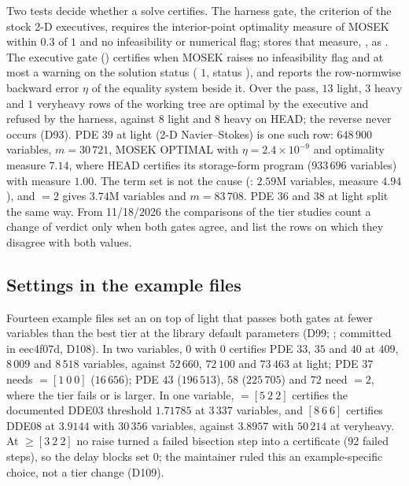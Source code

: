 Two tests decide whether a solve certifies. The harness gate, the criterion of the stock 2-D executives, requires the interior-point optimality measure of MOSEK within $0.3$ of $1$ and no infeasibility or numerical flag;  stores that measure, , as . The executive gate () certifies when MOSEK raises no infeasibility flag and at most a warning on the solution status ( $1$, status ), and reports the row-normwise backward error $\eta$ of the equality system beside it. Over the pass, $13$ light, $3$ heavy and $1$ veryheavy rows of the working tree are optimal by the executive and refused by the harness, against $8$ light and $8$ heavy on HEAD; the reverse never occurs (D93). PDE $39$ at light (2-D Navier--Stokes) is one such row: $648\,900$ variables, $m=30\,721$, MOSEK OPTIMAL with $\eta=2.4\times10^{-9}$ and optimality measure $7.14$, where HEAD certifies its storage-form program ($933\,696$ variables) with measure $1.00$. The term set is not the cause (: $2.59$M variables, measure $4.94$), and  $=2$ gives $3.74$M variables and $m=83\,708$. PDE $36$ and $38$ at light split the same way. From 11/18/2026 the comparisons of the tier studies count a change of verdict only when both gates agree, and list the rows on which they disagree with both values.

\subsection{Settings in the example files}\label{sec:libpass-examples}

Fourteen example files set an  on top of light that passes both gates at fewer variables than the best tier at the library default parameters (D99; ; committed in eec4f07d, D108). In two variables,  $0$ with  $0$ certifies PDE $33$, $35$ and $40$ at $409$, $8\,009$ and $8\,518$ variables, against $52\,660$, $72\,100$ and $73\,463$ at light; PDE $37$ needs  $=[1\ 0\ 0]$ ($16\,656$); PDE $43$ ($196\,513$), $58$ ($225\,705$) and $72$ need  $=2$, where the tier fails or is larger. In one variable,  $=[5\ 2\ 2]$ certifies the documented DDE03 threshold $1.71785$ at $3\,337$ variables, and $[8\ 6\ 6]$ certifies DDE08 at $3.9144$ with $30\,356$ variables, against $3.8957$ with $50\,214$ at veryheavy. At  $\ge[3\ 2\ 2]$ no raise turned a failed bisection step into a certificate (92 failed steps), so the delay blocks set  $0$; the maintainer ruled this an example-specific choice, not a tier change (D109).

